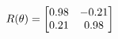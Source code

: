 \documentclass[preview]{standalone}
\begin{document}
\begin{align*}
\special{dvisvgm:raw <g id='unique000'>}R(\theta) = \begin{bmatrix}0.98 & -0.21\\0.21 & 0.98\end{bmatrix}\special{dvisvgm:raw </g>}
\end{align*}
\end{document}
